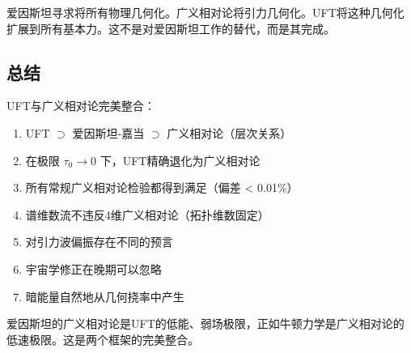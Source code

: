 \begin{remark}[完成爱因斯坦的梦想]
爱因斯坦寻求将所有物理几何化。广义相对论将引力几何化。UFT将这种几何化扩展到所有基本力。这不是对爱因斯坦工作的替代，而是其完成。
\end{remark}

\subsection{总结}

UFT与广义相对论完美整合：
\begin{enumerate}
    \item UFT $\supset$ 爱因斯坦-嘉当 $\supset$ 广义相对论（层次关系）
    \item 在极限 $\tau_0 \to 0$ 下，UFT精确退化为广义相对论
    \item 所有常规广义相对论检验都得到满足（偏差 < 0.01\%）
    \item 谱维数流不违反4维广义相对论（拓扑维数固定）
    \item 对引力波偏振存在不同的预言
    \item 宇宙学修正在晚期可以忽略
    \item 暗能量自然地从几何挠率中产生
\end{enumerate}

爱因斯坦的广义相对论是UFT的低能、弱场极限，正如牛顿力学是广义相对论的低速极限。这是两个框架的完美整合。
